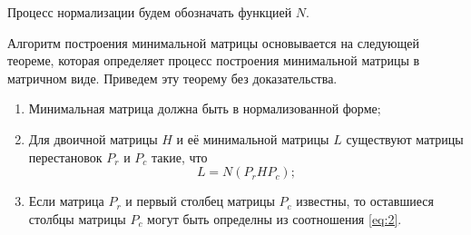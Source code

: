 Процесс нормализации будем обозначать функцией $N$.

Алгоритм построения минимальной матрицы основывается на следующей теореме, которая определяет процесс построения минимальной матрицы в матричном виде. Приведем эту теорему без доказательства.

\begin{Th}\normalfont\label{th:mm_algo}
    \begin{enumerate}
        \item Минимальная матрица должна быть в нормализованной форме;
        \item Для двоичной матрицы $H$ и её минимальной матрицы $L$ существуют матрицы перестановок $P_r$ и $P_c$ такие, что
            \begin{equation}\label{eq:2}
                L = N(P_r H P_c);
            \end{equation}
        \item Если матрица $P_r$ и первый столбец матрицы $P_c$ известны, то оставшиеся столбцы матрицы $P_c$ могут быть определны из соотношения \ref{eq:2}.
    \end{enumerate}
\end{Th}

